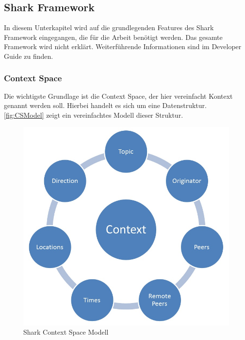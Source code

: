 \documentclass[a4paper]{article}
\begin{document}
	\subsection{Shark Framework}
	
	In diesem Unterkapitel wird auf die grundlegenden Features des Shark
	Framework \cite{SharkFW} eingegangen, die für die Arbeit benötigt werden. 	
	Das gesamte	Framework wird nicht erklärt. Weiterführende Informationen sind
	im Developer Guide \cite{SharkManual} zu finden.
	
	\subsubsection{Context Space} 
	\label{sec:CS}
	
	Die wichtigste Grundlage ist die Context Space, der hier vereinfacht Kontext
	genannt werden soll. Hierbei handelt es sich um eine Datenstruktur.
	\autoref{fig:CSModel} zeigt ein vereinfachtes Modell dieser Struktur.
	
	\begin{figure}[H] 
		\includegraphics[width=\linewidth]{../Bilder/contextspace.jpg}
		\caption{Shark Context Space Modell}
		\label{fig:CSModel}
	\end{figure}
	
\end{document}
